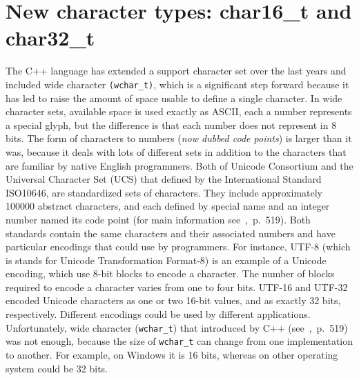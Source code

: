 \documentclass[11pt]{report}
\begin{document}
\section{New character types: char16\_t and char32\_t}
\label{section: char16_t and char32_t}
The C++ language has extended a support character set over the last years and included wide character \texttt{(wchar\_t)}, which is a significant step forward because it has led to raise the amount of space usable to define a single character. In wide character sets, available space is used exactly as ASCII, each a number represents a special glyph, but the difference is that each number does not represent in 8 bits. The form of characters to numbers (\emph{now dubbed code points}) is larger than it was, because it deals with lots of different sets in addition to the characters that are familiar by native English programmers. Both of Unicode Consortium and the Universal Character Set (UCS) that defined by the International Standard ISO10646, are standardized sets of characters. They include approximately 100000 abstract characters, and each defined by special name and an integer number named its code point (for main information see~\cite{Gregorie:professionalcpp},~p.~519). Both standards contain the same characters and their associated numbers and have particular encodings that could use by programmers. For instance, UTF-8 (which is stands for Unicode Transformation Format-8) is an example of a Unicode encoding, which use 8-bit blocks to encode a character. The number of blocks required to encode a character varies from one to four bits. UTF-16 and UTF-32 encoded Unicode characters as one or two 16-bit values, and as exactly 32 bits, respectively. Different encodings could be used by different applications. Unfortunately, wide character (\texttt{wchar\_t}) that introduced by C++ (see~\cite{Gregorie:professionalcpp},~p.~519) was not enough, because the size of \texttt{wchar\_t} can change from one implementation to another. For example, on Windows it is 16 bits, whereas on other operating system could be 32 bits.
\end{document}
